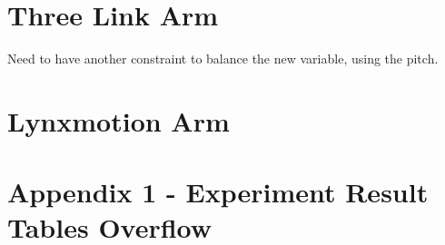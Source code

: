 \documentclass[11.5pt, twoside, a4paper]{article}
\begin{document}
\section{Three Link Arm}

Need to have another constraint to balance the new variable, using the pitch.

\section{Lynxmotion Arm}


\section{Appendix 1 - Experiment Result Tables Overflow}





{}
\end{document}
